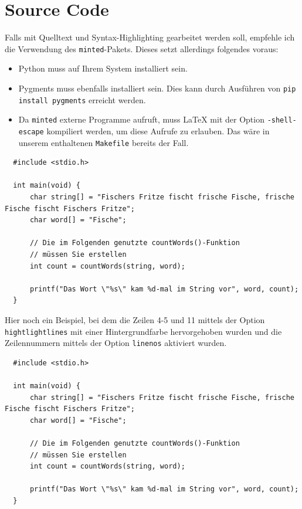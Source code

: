 \section{Source Code}

Falls mit Quelltext und Syntax-Highlighting gearbeitet werden soll, empfehle ich
die Verwendung des \texttt{minted}-Pakets. Dieses setzt allerdings folgendes
voraus:

\begin{itemize}
  \item Python muss auf Ihrem System installiert sein.
  \item Pygments muss ebenfalls installiert sein. Dies kann durch Ausführen von
  \texttt{pip install pygments} erreicht werden.
  \item Da \texttt{minted} externe Programme aufruft, muss LaTeX mit der Option
  \texttt{-shell-escape} kompiliert werden, um diese Aufrufe zu erlauben. Das
  wäre in unserem enthaltenen \texttt{Makefile} bereits der Fall.
\end{itemize}

\begin{verbatim}
  #include <stdio.h>
  
  int main(void) {
      char string[] = "Fischers Fritze fischt frische Fische, frische Fische fischt Fischers Fritze";
      char word[] = "Fische";
  
      // Die im Folgenden genutzte countWords()-Funktion
      // müssen Sie erstellen
      int count = countWords(string, word);
  
      printf("Das Wort \"%s\" kam %d-mal im String vor", word, count);
  }
\end{verbatim}

Hier noch ein Beispiel, bei dem die Zeilen 4-5 und 11 mittels der Option
\texttt{hightlightlines} mit einer Hintergrundfarbe hervorgehoben wurden und die
Zeilennummern mittels der Option \texttt{linenos} aktiviert wurden.


\begin{verbatim}
  #include <stdio.h>
  
  int main(void) {
      char string[] = "Fischers Fritze fischt frische Fische, frische Fische fischt Fischers Fritze";
      char word[] = "Fische";
  
      // Die im Folgenden genutzte countWords()-Funktion
      // müssen Sie erstellen
      int count = countWords(string, word);
  
      printf("Das Wort \"%s\" kam %d-mal im String vor", word, count);
  }
\end{verbatim}

